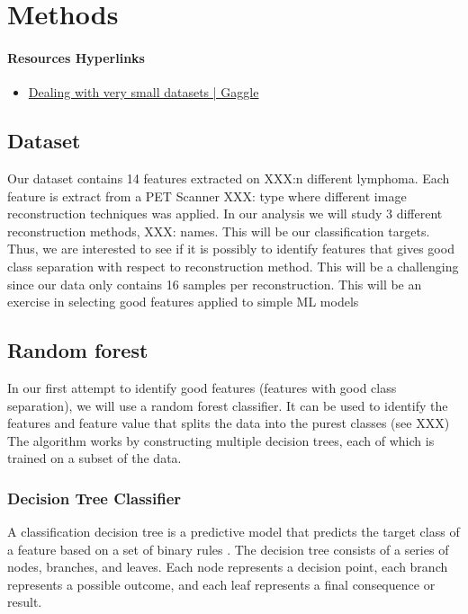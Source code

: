 \section{Methods}
\paragraph{Resources Hyperlinks} 
\begin{itemize}
    \item \href{https://www.kaggle.com/code/rafjaa/dealing-with-very-small-datasets}{Dealing with very small datasets | Gaggle}
    
\end{itemize}


\subsection{Dataset}


Our dataset contains 14 features extracted on XXX:n different lymphoma. Each
feature is extract from a PET Scanner XXX: type where different image
reconstruction techniques was applied. In our analysis we will study 3
different reconstruction methods, XXX: names. This will be our classification
targets. Thus, we are interested to see if it is possibly to identify features
that gives good class separation with respect to reconstruction method. This
will be a challenging since our data only contains 16 samples per
reconstruction. This will be an exercise in selecting good features applied to
simple ML models


\subsection{Random forest}
In our first attempt to identify good features (features with good
class separation), we will use a random forest classifier. 
It can be used to identify the features and feature value that splits the data
into the purest classes (see XXX)
The algorithm works by constructing multiple decision trees, each of which is trained 
on a subset of the data. 

\subsubsection{Decision Tree Classifier}
A classification decision tree is a predictive model that predicts the target
class of a feature based on a set of binary rules . The decision tree consists of a series of
nodes, branches, and leaves. Each node represents a decision point, each branch
represents a possible outcome, and each leaf represents a final consequence or
result. 

